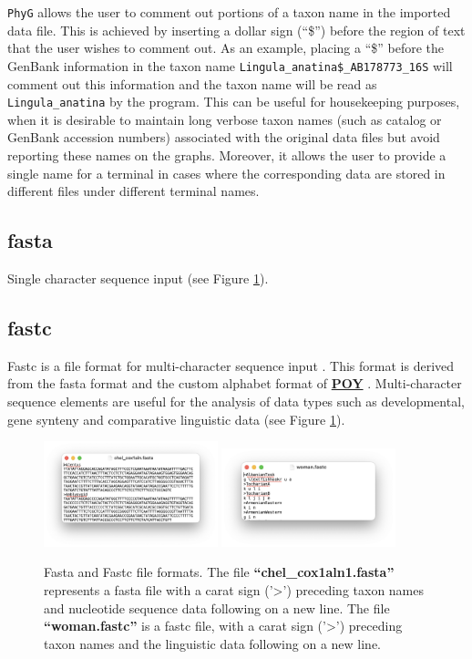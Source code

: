 \documentclass[11pt]{book}
\newcommand{\phyg}{\texttt{PhyG} }
\begin{document}
{{	\phyg allows the user to comment out portions of a taxon name 
	in the imported data file. This is achieved by inserting a dollar sign (``\$'') before the region 
	of text that the user wishes to comment out. As an example, placing a ``\$'' before the 
	GenBank information in the taxon name \texttt{Lingula\_anatina\$\_AB178773\_16S} 
	will comment out this information and the taxon name will be read as 
	\texttt{Lingula\_anatina} by the program. This can be useful for housekeeping purposes, 
	when it is desirable to maintain long verbose taxon names (such as catalog or GenBank 
	accession numbers) associated with the original data files but avoid reporting these 
	names on the graphs. Moreover, it allows the user to provide a single name for a terminal
	in cases where the corresponding data are stored in different files under different terminal
	names.
		
	\subsection{fasta}
		Single character sequence input \citep{PearsonandLipman1988} (see Figure \ref{fasta-c}).
		
	\subsection{fastc}
		Fastc is a file format for multi-character sequence input \citep{WheelerandWashburn2019}.
		This format is derived from the fasta format and the custom alphabet format of 
		 \href{https://github.com/wardwheeler/POY5}{\textbf{POY}} \citep{POY4,POY5}. 
		 Multi-character sequence elements are useful for the analysis of data types such 
		 as developmental, gene synteny and comparative linguistic data (see Figure \ref{fasta-c}).
		 
		\begin{figure}[H]
		\centering
		\includegraphics[width=0.45\textwidth]{fasta.png}
		\includegraphics[width=0.45\textwidth]{fastc.png}
		\caption{Fasta and Fastc file formats. The file \textbf{``chel\_cox1aln1.fasta''} 
		represents a fasta file with a carat sign ('>') preceding taxon names and nucleotide  
		sequence data following on a new line. The file \textbf{``woman.fastc''} is a fastc 
		file, with a carat sign ('>') preceding taxon names and the linguistic data following 
		on a new line.}
		\label{fasta-c}
		\end{figure}
		
}}
\end{document}
